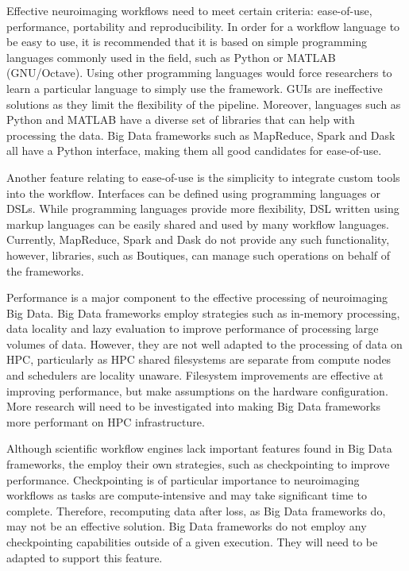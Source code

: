         Effective neuroimaging workflows need to meet certain criteria:
        ease-of-use, performance, portability and reproducibility. In order 
        for a workflow language to be easy to
        use, it is recommended that it is based on simple programming languages
        commonly used in the field, such as Python or MATLAB (GNU/Octave). Using
        other programming languages would force researchers to learn a
        particular language to simply use the framework. GUIs are ineffective
        solutions as they limit the flexibility of the pipeline. Moreover,
        languages such as Python and MATLAB have a diverse set of libraries that
        can help with processing the data. Big Data frameworks such as
        MapReduce, Spark and Dask all have a Python interface, making them all
        good candidates for ease-of-use.


        Another feature relating to ease-of-use is the simplicity to integrate
        custom tools into the workflow. Interfaces can be defined using
        programming languages or DSLs. While programming languages provide more
        flexibility, DSL written using markup languages can be easily shared and
        used by many workflow languages. Currently, MapReduce, Spark and Dask do
        not provide any such functionality, however, libraries, such as
        Boutiques, can manage such operations on behalf of the frameworks.


        Performance is a major component to the effective processing of
        neuroimaging Big Data. Big Data frameworks employ strategies such as
        in-memory processing, data locality and lazy evaluation to improve
        performance of processing large volumes of data. However, they are not
        well adapted to the processing of data on HPC, particularly as HPC
        shared filesystems are separate from compute nodes and schedulers are
        locality unaware. Filesystem improvements are effective at improving
        performance, but make assumptions on the hardware configuration. More
        research will need to be investigated into making Big Data frameworks
        more performant on HPC infrastructure.

        Although scientific workflow engines lack important features found in
        Big Data frameworks, the employ their own strategies, such as
        checkpointing to improve performance. Checkpointing is of particular
        importance to neuroimaging workflows as tasks are compute-intensive and
        may take significant time to complete. Therefore, recomputing data after
        loss, as Big Data frameworks do, may not be an effective solution. Big
        Data frameworks do not employ any checkpointing capabilities outside of
        a given execution. They will need to be adapted to support this feature.


